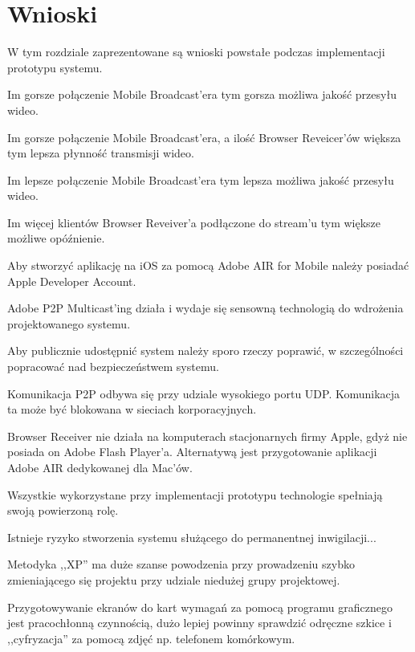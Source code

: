 \newpage
\section{Wnioski}

W tym rozdziale zaprezentowane są wnioski powstałe podczas implementacji prototypu systemu.

\begin{packed_item}
    \item{Im gorsze połączenie Mobile Broadcast'era tym gorsza możliwa jakość przesyłu wideo.}
    \item{Im gorsze połączenie Mobile Broadcast'era, a ilość Browser Reveicer'ów większa tym lepsza płynność transmisji wideo.}
    \item{Im lepsze połączenie Mobile Broadcast'era tym lepsza możliwa jakość przesyłu wideo.}
    \item{Im więcej klientów Browser Reveiver'a podłączone do stream'u tym większe możliwe opóźnienie.}
    \item{Aby stworzyć aplikację na iOS za pomocą Adobe AIR for Mobile należy posiadać Apple Developer Account.}
    \item{Adobe P2P Multicast'ing działa i wydaje się sensowną technologią do wdrożenia projektowanego systemu.}
    \item{Aby publicznie udostępnić system należy sporo rzeczy poprawić, w szczególności popracować nad bezpieczeństwem systemu.}
    \item{Komunikacja P2P odbywa się przy udziale wysokiego portu UDP. Komunikacja ta może być blokowana w sieciach korporacyjnych.}
    \item{Browser Receiver nie działa na komputerach  stacjonarnych firmy Apple, gdyż nie posiada on Adobe Flash Player'a. Alternatywą jest przygotowanie aplikacji Adobe AIR dedykowanej dla Mac'ów.}
    \item{Wszystkie wykorzystane przy implementacji prototypu technologie spełniają swoją powierzoną rolę.}
    \item{Istnieje ryzyko stworzenia systemu służącego do permanentnej inwigilacji...}
    \item{Metodyka ,,XP'' ma duże szanse powodzenia przy prowadzeniu szybko zmieniającego się projektu przy udziale niedużej grupy projektowej.}
    \item{Przygotowywanie ekranów do kart wymagań za pomocą programu graficznego jest pracochłonną czynnością, dużo lepiej powinny sprawdzić odręczne szkice i ,,cyfryzacja'' za pomocą zdjęć np. telefonem komórkowym.}
\end{packed_item}

\newpage

